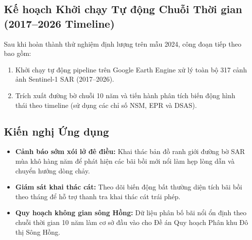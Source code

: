 \documentclass[11pt,a4paper]{article}
\begin{document}
\subsection{Kế hoạch Khởi chạy Tự động Chuỗi Thời gian (2017--2026 Timeline)}
Sau khi hoàn thành thử nghiệm định lượng trên mẫu 2024, công đoạn tiếp theo bao gồm:
\begin{enumerate}
    \item Khởi chạy tự động pipeline trên Google Earth Engine xử lý toàn bộ 317 cảnh ảnh Sentinel-1 SAR (2017--2026).
    \item Trích xuất đường bờ chuỗi 10 năm và tiến hành phân tích biến động hình thái theo timeline (sử dụng các chỉ số NSM, EPR và DSAS).
\end{enumerate}

\subsection{Kiến nghị Ứng dụng}
\begin{itemize}
    \item \textbf{Cảnh báo sớm xói lở đê điều:} Khai thác bản đồ ranh giới đường bờ SAR mùa khô hàng năm để phát hiện các bãi bồi mới nổi làm hẹp lòng dẫn và chuyển hướng dòng chảy.
    \item \textbf{Giám sát khai thác cát:} Theo dõi biến động bất thường diện tích bãi bồi theo tháng để hỗ trợ thanh tra khai thác cát trái phép.
    \item \textbf{Quy hoạch không gian sông Hồng:} Dữ liệu phân bố bãi nổi ổn định theo chuỗi thời gian 10 năm làm cơ sở đầu vào cho Đề án Quy hoạch Phân khu Đô thị Sông Hồng.
\end{itemize}
\end{document}
